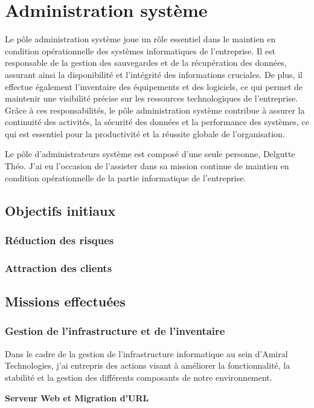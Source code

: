 \section{Administration système}
Le pôle administration système joue un rôle essentiel dans le maintien en condition opérationnelle des systèmes informatiques de l'entreprise.
Il est responsable de la gestion des sauvegardes et de la récupération des données, assurant ainsi la disponibilité et l'intégrité des informations cruciales.
De plus, il effectue également l'inventaire des équipements et des logiciels, ce qui permet de maintenir une visibilité précise sur les ressources technologiques de l'entreprise.
Grâce à ces responsabilités, le pôle administration système contribue à assurer la continuité des activités, la sécurité des données et la performance des systèmes, ce qui est essentiel pour la productivité et la réussite globale de l'organisation.

Le pôle d'administrateurs système est composé d'une seule personne, Delgutte Théo.
J'ai eu l'occasion de l'assister dans sa mission continue de maintien en condition opérationnelle de la partie informatique de l'entreprise.

\subsection{Objectifs initiaux}
\subsubsection{Réduction des risques}

\subsubsection{Attraction des clients}


\subsection{Missions effectuées}
\subsubsection{Gestion de l'infrastructure et de l'inventaire}
Dans le cadre de la gestion de l'infrastructure informatique au sein d'Amiral Technologies, j'ai entrepris des actions visant à améliorer la fonctionnalité, la stabilité et la gestion des différents composants de notre environnement.

\textbf{Serveur Web et Migration d'URL}


